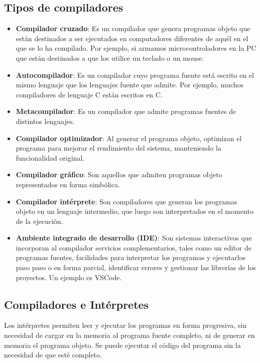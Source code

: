 \documentclass[12pt]{article}
\begin{document}
\subsection{Tipos de compiladores}
\begin{itemize}
	\item \textbf{Compilador cruzado}: Es un compilador que genera programas objeto que están destinados a ser ejecutados en computadores diferentes de aquél en el que se lo ha compilado. Por ejemplo, si armamos microcontroladores en la PC que están destinados a que los utilice un teclado o un mouse.

	\item \textbf{Autocompilador}: Es un compilador cuyo programa fuente está escrito en el mismo lenguaje que los lenguajes fuente que admite. Por ejemplo, muchos compiladores de lenguaje C están escritos en C.

	\item \textbf{Metacompilador}: Es un compilador que admite programas fuentes de distintos lenguajes.

	\item \textbf{Compilador optimizador}: Al generar el programa objeto, optimizan el programa para mejorar el rendimiento del sistema, manteniendo la funcionalidad original.

	\item \textbf{Compilador gráfico}: Son aquellos que admiten programas objeto representados en forma simbólica.

	\item \textbf{Compilador intérprete}: Son compiladores que generan los programas objeto en un lenguaje intermedio, que luego son interpretados en el momento de la ejecución.

	\item \textbf{Ambiente integrado de desarrollo (IDE)}: Son sistemas interactivos que incorporan al compilador servicios complementarios, tales como un editor de programas fuentes, facilidades para interpretar los programas y ejecutarlos paso paso o en forma parcial, identificar errores y gestionar las librerías de los proyectos. Un ejemplo es VSCode.
\end{itemize}

\subsection{Compiladores e Intérpretes}
Los intérpretes permiten leer y ejecutar los programas en forma progresiva, sin necesidad de cargar en la memoria al programa fuente completo, ni de generar en memoria el programa objeto. Se puede ejecutar el código del programa sin la necesidad de que esté completo.
\end{document}
